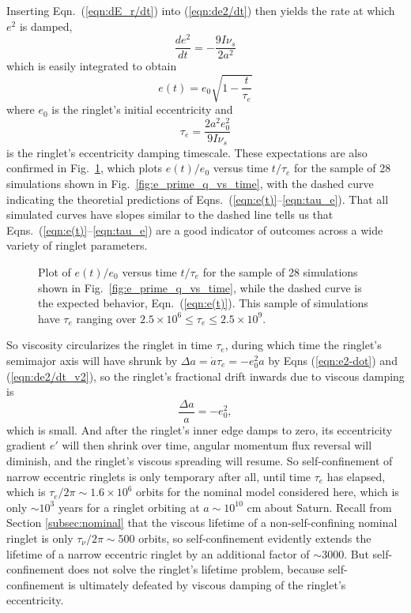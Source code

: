 \documentclass[preprint]{aastex62}
\begin{document}
Inserting Eqn.\ (\ref{eqn:dE_r/dt}) into (\ref{eqn:de2/dt}) then yields the rate at which $e^2$
is damped,
\begin{equation}
    \label{eqn:de2/dt_v2}
    \frac{de^2}{dt} = -\frac{9I\nu_s}{2a^2}
\end{equation}
which is easily integrated to obtain
\begin{equation}
    \label{eqn:e(t)}
    e(t) = e_0\sqrt{1-\frac{t}{\tau_e}}
\end{equation}
where $e_0$ is the ringlet's initial eccentricity and
\begin{equation}
    \label{eqn:tau_e}
    \tau_e = \frac{2a^2e_0^2}{9I\nu_s}
\end{equation}
is the ringlet's eccentricity damping timescale.
These expectations are also confirmed in Fig.\ \ref{fig:e_vs_tau_e}, which plots
$e(t)/e_0$ versus time $t/\tau_e$ for the sample of 28 simulations 
shown in Fig.\ \ref{fig:e_prime_q_vs_time}, with the dashed curve
indicating the theoretial predictions of Eqns.\ (\ref{eqn:e(t)}--\ref{eqn:tau_e}).
That all simulated curves have slopes similar to the dashed line tells us that
Eqns.\ (\ref{eqn:e(t)}--\ref{eqn:tau_e}) are a good indicator of outcomes across
a wide variety of ringlet parameters.
\begin{figure}
    \caption{
        \label{fig:e_vs_tau_e}
        Plot of $e(t)/e_0$ versus time $t/\tau_e$ for the sample of 28
        simulations shown in Fig.\ \ref{fig:e_prime_q_vs_time},
        while the dashed curve is the expected behavior, Eqn.\ (\ref{eqn:e(t)}).
        This sample of simulations have $\tau_e$ ranging over 
        $2.5\times10^6 \le \tau_e \le 2.5\times10^9$.
    }
\end{figure}

So viscosity circularizes the ringlet in time $\tau_e$, during which time the ringlet's
semimajor axis will have shrunk by $\Delta a=\dot{a}\tau_e=-e_0^2a$ by Eqns (\ref{eqn:e2-dot})
and (\ref{eqn:de2/dt_v2}), so the ringlet's
fractional drift inwards due to viscous damping is
\begin{equation}
    \label{eqn:delta-a}
    \frac{\Delta a}{a} = -e_0^2,
\end{equation}
which is small. And after the ringlet's inner edge damps to zero, its eccentricity gradient $e'$
will then shrink over time, angular momentum flux reversal will diminish, and the ringlet's 
viscous spreading will resume. So self-confinement of narrow eccentric ringlets is only temporary
after all, until time $\tau_e$ has elapsed, which is $\tau_e/2\pi\sim1.6\times10^6$ orbits for 
the nominal model considered here, which is only $\sim10^3$ years for a ringlet orbiting at 
$a\sim10^{10}$ cm about Saturn. Recall from Section \ref{subsec:nominal}
that the viscous lifetime of a non-self-confining
nominal ringlet is only $\tau_\nu/2\pi\sim500$ orbits, so self-confinement evidently
extends the lifetime of a narrow eccentric ringlet by an additional 
factor of $\sim3000$. But self-confinement
does not solve the ringlet's lifetime problem, because self-confinement is ultimately
defeated by viscous damping of the ringlet's eccentricity.
\end{document}
